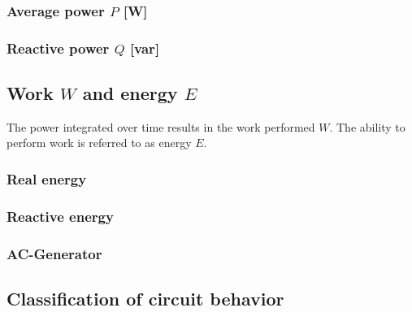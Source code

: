 \documentclass{article}
\begin{document}
\subsubsection{Average power $P$ [W]}

\subsubsection{Reactive power $Q$ [var]}

\subsection{Work $W$ and energy $E$}
The power integrated over time results in the work performed $W$.
The ability to perform work is referred to as energy $E$.

\subsubsection{Real energy}

\subsubsection{Reactive energy}

\subsubsection{AC-Generator}

\newpage
\subsection{Classification of circuit behavior}
\end{document}
